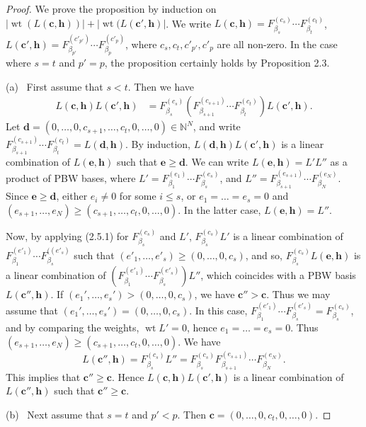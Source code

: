 \documentclass[12pt]{amsart}
\renewcommand\b{\beta}
\renewcommand{\1}{\mathbb 1}
\newcommand{\NN}{\mathbb N}
\newcommand\Bh{\mathbf h}
\newcommand\Bc{\mathbf c}
\newcommand\Bd{\mathbf d}
\newcommand\Be{\mathbf e}
\newcommand\weit{\operatorname{wt}}
\numberwithin{equation}{section}
\begin{document}
\begin{proof}
We prove the proposition by induction on $|\weit(L(\Bc,\Bh))| + |\weit(L(\Bc',\Bh)|$.
We write $L(\Bc,\Bh) = F_{\b_s}^{(c_s)}\cdots F_{\b_t}^{(c_t)}$,
$L(\Bc',\Bh) = F_{\b_{p'}}^{(c'_{p'})}\cdots F_{\b_p}^{(c'_p)}$, where
$c_s, c_t,c'_{p'}, c'_p$ are all non-zero.
In the case where $s = t$ and $p' = p$, the proposition certainly holds by
Proposition 2.3.
\par
(a) \ First assume that $s< t$.  Then we have
\begin{align*}
\tag{2.5.2}  
  L(\Bc, \Bh)L(\Bc',\Bh) 
         &= F_{\b_s}^{(c_s)}
           (F_{\b_{s+1}}^{(c_{s+1})}\cdots F_{\b_t}^{(c_t)})L(\Bc', \Bh).
\end{align*}
Let $\Bd = (0, \dots, 0, c_{s+1}, \dots, c_t, 0, \dots, 0) \in \NN^N$, and 
write $F_{\b_{s+1}}^{(c_{s+1})}\cdots F_{\b_t}^{(c_t)} = L(\Bd, \Bh)$.
By induction, $L(\Bd, \Bh)L(\Bc',\Bh)$
is a linear combination of $L(\Be, \Bh)$ such that $\Be \ge \Bd$.
We can write $L(\Be,\Bh) = L'L''$ as a product of PBW bases,
where $L' = F_{\b_1}^{(e_1)}\cdots F_{\b_s}^{(e_s)}$,
and $L'' = F_{\b_{s+1}}^{(e_{s+1})}\cdots F_{\b_N}^{(e_N)}$.
Since $\Be \ge \Bd$, either $e_i \ne 0$ for some $i \le s$, 
or $e_1 = \dots = e_s = 0$ and
$(e_{s+1}, \dots, e_N) \ge (c_{s+1}, \dots, c_t, 0, \dots,0)$. 
In the latter case, $L(\Be,\Bh) = L''$. 
\par
Now, by applying (2.5.1) for $F_{\b_s}^{(c_s)}$ and $L'$,
$F_{\b_s}^{(c_s)}L'$ is a linear combination of
$F_{\b_1}^{(e'_1)}\cdots F_{\b_s}^{((e'_s)}$ such that
$(e'_1, \dots, e'_s) \ge (0, \dots, 0, c_s)$, and so,
$F_{\b_s}^{(c_s)}L(\Be,\Bh)$ is a linear combination of
$(F_{\b_1}^{(e'_1)}\cdots F_{\b_s}^{(e'_s)})L''$, which coincides with a PBW basis
$L(\Bc'',\Bh)$.  If $(e_1', \dots, e_s') > (0,\dots, 0, c_s)$, we have $\Bc''> \Bc$.
Thus we may assume that $(e_1', \dots, e_s') = (0, \dots, 0, c_s)$. 
In this case, $F_{\b_1}^{(e'_1)}\cdots F_{\b_s}^{(e'_s)} = F_{\b_s}^{(c_s)}$,
and by comparing the weights, $\weit L' = 0$, hence $e_1 = \dots = e_s = 0$.
Thus $(e_{s+1}, \dots, e_N) \ge (c_{s+1}, \dots, c_t, 0, \dots, 0)$.
We have
\begin{equation*}
L(\Bc'',\Bh) =
F_{\b_s}^{(c_s)}L'' = F_{\b_s}^{(c_s)}F_{\b_{s+1}}^{(e_{s+1})}\cdots F_{\b_N}^{(e_N)}.
\end{equation*}
This implies that $\Bc'' \ge \Bc$. 
Hence $L(\Bc,\Bh)L(\Bc',\Bh)$ is a linear combination of $L(\Bc'',\Bh)$ such that
$\Bc'' \ge \Bc$.
\par
(b) \ Next assume that $s = t$ and $p' < p$. Then $\Bc = (0, \dots, 0, c_t, 0, \dots, 0)$.

\end{proof}
\end{document}
